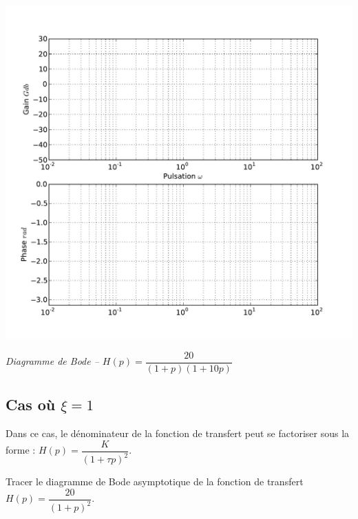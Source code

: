 \documentclass[10pt,oneside]{article}
\begin{document}
\begin{center}
\includegraphics[width=.9\textwidth]{png/bode_vierge}

\textit{Diagramme de Bode -- $H(p)=\dfrac{20}{\left(1+ p \right)\left(1+10 p \right)}$}
\end{center}




\subsection{Cas où $\xi=1$}
Dans ce cas, le dénominateur de la fonction de transfert peut se factoriser sous la forme :
$H(p)=\dfrac{K}{\left(1+\tau p \right)^2}$.

Tracer le diagramme de Bode asymptotique de la fonction de transfert 
$H(p)=\dfrac{20}{\left(1+ p \right)^2}$.
\end{document}
